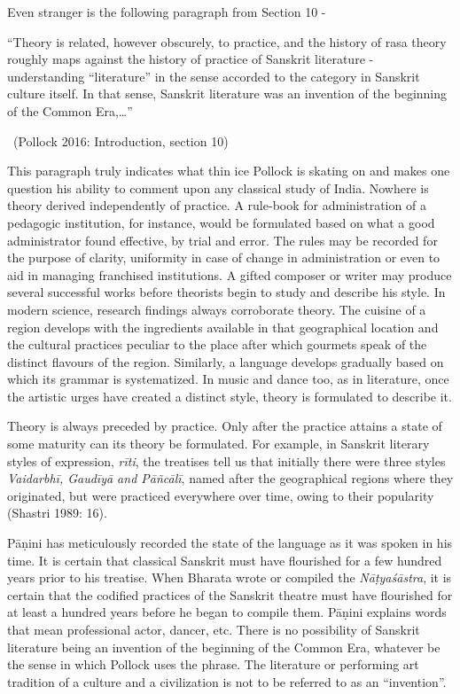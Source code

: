 Even stranger is the following paragraph from Section 10 -

\begin{myquote}
“Theory is related, however obscurely, to practice, and the history of rasa theory roughly maps against the history of practice of Sanskrit literature - understanding “literature” in the sense accorded to the category in Sanskrit culture itself. In that sense, Sanskrit literature was an invention of the beginning of the Common Era,…” 

~\hfill (Pollock 2016: Introduction, section 10)
\end{myquote}

This paragraph truly indicates what thin ice Pollock is skating on and makes one question his ability to comment upon any classical study of India. Nowhere is theory derived independently of practice. A rule-book for administration of a pedagogic institution, for instance, would be formulated based on what a good administrator found effective, by trial and error. The rules may be recorded for the purpose of clarity, uniformity in case of change in administration or even to aid in managing franchised institutions. A gifted composer or writer may produce several successful works before theorists begin to study and describe his style. In modern science, research findings always corroborate theory. The cuisine of a region develops with the ingredients available in that geographical location and the cultural practices peculiar to the place after which gourmets speak of the distinct flavours of the region. Similarly, a language develops gradually based on which its grammar is systematized. In music and dance too, as in literature, once the artistic urges have created a distinct style, theory is formulated to describe it.

Theory is always preceded by practice. Only after the practice attains a state of some maturity can its theory be formulated. For example, in Sanskrit literary styles of expression, \textit{rīti}, the treatises tell us that initially there were three styles \textit{Vaidarbhī, Gaudīyā and Pāñcālī}, named after the geographical regions where they originated, but were practiced everywhere over time, owing to their popularity (Shastri 1989: 16).

Pāṇini has meticulously recorded the state of the language as it was spoken in his time. It is certain that classical Sanskrit must have flourished for a few hundred years prior to his treatise. When Bharata wrote or compiled the \textit{Nāṭyaśāstra}, it is certain that the codified practices of the Sanskrit theatre must have flourished for at least a hundred years before he began to compile them. Pāṇini explains words that mean professional actor, dancer, etc. There is no possibility of Sanskrit literature being an invention of the beginning of the Common Era, whatever be the sense in which Pollock uses the phrase. The literature or performing art tradition of a culture and a civilization is not to be referred to as an “invention”.


